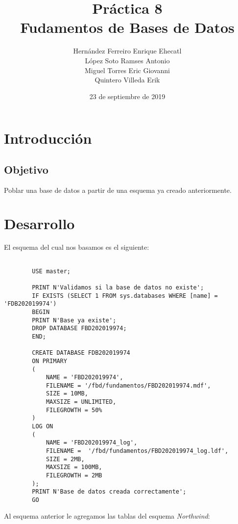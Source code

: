\documentclass[12pt, letterpaper]{article}
\author{Hernández Ferreiro Enrique Ehecatl \\
        López Soto Ramses Antonio \\
        Miguel Torres Eric Giovanni \\
        Quintero Villeda Erik}
\title{Práctica 8 \\
       {\small Fudamentos de Bases de Datos}}
\date{23 de septiembre de 2019}
\begin{document}
    \maketitle

    \section*{Introducción} 

        \subsection*{Objetivo}
        Poblar una base de datos a partir de una esquema ya creado anteriormente.

    \section*{Desarrollo}
    El esquema del cual nos basamos es el siguiente: 

    {\scriptsize
    \begin{lstlisting}
    
        USE master;

        PRINT N'Validamos si la base de datos no existe';
        IF EXISTS (SELECT 1 FROM sys.databases WHERE [name] = 'FDB202019974')
        BEGIN
        PRINT N'Base ya existe';
        DROP DATABASE FBD202019974;
        END;

        CREATE DATABASE FDB202019974
        ON PRIMARY
        (
            NAME = 'FBD202019974',
            FILENAME = '/fbd/fundamentos/FBD202019974.mdf',
            SIZE = 10MB,
            MAXSIZE = UNLIMITED,
            FILEGROWTH = 50%
        )
        LOG ON
        (
            NAME = 'FBD202019974_log',
            FILENAME =  '/fbd/fundamentos/FBD202019974_log.ldf',
            SIZE = 2MB,
            MAXSIZE = 100MB,
            FILEGROWTH = 2MB
        );
        PRINT N'Base de datos creada correctamente';
        GO
    \end{lstlisting}} \vspace{.2cm}

    Al esquema anterior le agregamos las tablas del esquema \textit{Northwind}:
\end{document}
